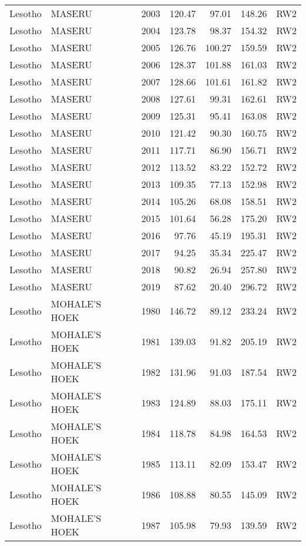 \begin{longtable}{lllrrrl}
  Lesotho & MASERU & 2003 & 120.47 & 97.01 & 148.26 & RW2 \\ 
  Lesotho & MASERU & 2004 & 123.78 & 98.37 & 154.32 & RW2 \\ 
  Lesotho & MASERU & 2005 & 126.76 & 100.27 & 159.59 & RW2 \\ 
  Lesotho & MASERU & 2006 & 128.37 & 101.88 & 161.03 & RW2 \\ 
  Lesotho & MASERU & 2007 & 128.66 & 101.61 & 161.82 & RW2 \\ 
  Lesotho & MASERU & 2008 & 127.61 & 99.31 & 162.61 & RW2 \\ 
  Lesotho & MASERU & 2009 & 125.31 & 95.41 & 163.08 & RW2 \\ 
  Lesotho & MASERU & 2010 & 121.42 & 90.30 & 160.75 & RW2 \\ 
  Lesotho & MASERU & 2011 & 117.71 & 86.90 & 156.71 & RW2 \\ 
  Lesotho & MASERU & 2012 & 113.52 & 83.22 & 152.72 & RW2 \\ 
  Lesotho & MASERU & 2013 & 109.35 & 77.13 & 152.98 & RW2 \\ 
  Lesotho & MASERU & 2014 & 105.26 & 68.08 & 158.51 & RW2 \\ 
  Lesotho & MASERU & 2015 & 101.64 & 56.28 & 175.20 & RW2 \\ 
  Lesotho & MASERU & 2016 & 97.76 & 45.19 & 195.31 & RW2 \\ 
  Lesotho & MASERU & 2017 & 94.25 & 35.34 & 225.47 & RW2 \\ 
  Lesotho & MASERU & 2018 & 90.82 & 26.94 & 257.80 & RW2 \\ 
  Lesotho & MASERU & 2019 & 87.62 & 20.40 & 296.72 & RW2 \\ 
  Lesotho & MOHALE'S HOEK & 1980 & 146.72 & 89.12 & 233.24 & RW2 \\ 
  Lesotho & MOHALE'S HOEK & 1981 & 139.03 & 91.82 & 205.19 & RW2 \\ 
  Lesotho & MOHALE'S HOEK & 1982 & 131.96 & 91.03 & 187.54 & RW2 \\ 
  Lesotho & MOHALE'S HOEK & 1983 & 124.89 & 88.03 & 175.11 & RW2 \\ 
  Lesotho & MOHALE'S HOEK & 1984 & 118.78 & 84.98 & 164.53 & RW2 \\ 
  Lesotho & MOHALE'S HOEK & 1985 & 113.11 & 82.09 & 153.47 & RW2 \\ 
  Lesotho & MOHALE'S HOEK & 1986 & 108.88 & 80.55 & 145.09 & RW2 \\ 
  Lesotho & MOHALE'S HOEK & 1987 & 105.98 & 79.93 & 139.59 & RW2 \\ 

\end{longtable}
